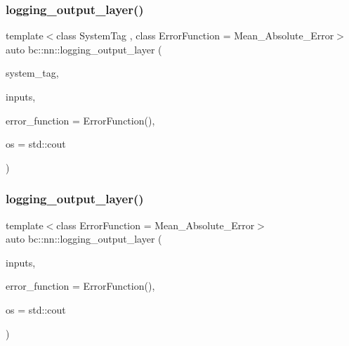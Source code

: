 \subsubsection{\texorpdfstring{logging\+\_\+output\+\_\+layer()}{logging\_output\_layer()}\hspace{0.1cm}{\footnotesize\ttfamily [2/3]}}
{\footnotesize\ttfamily template$<$class System\+Tag , class Error\+Function  = Mean\+\_\+\+Absolute\+\_\+\+Error$>$ \\
auto bc\+::nn\+::logging\+\_\+output\+\_\+layer (\begin{DoxyParamCaption}\item[{System\+Tag}]{system\+\_\+tag,  }\item[{\hyperlink{namespacebc_aaf8e3fbf99b04b1b57c4f80c6f55d3c5}{bc\+::size\+\_\+t}}]{inputs,  }\item[{Error\+Function}]{error\+\_\+function = {\ttfamily ErrorFunction()},  }\item[{std\+::ostream \&}]{os = {\ttfamily std\+:\+:cout} }\end{DoxyParamCaption})}

\mbox{\label{namespacebc_1_1nn_ab353668fc04b2496759be76e26c1697d}} 
\subsubsection{\texorpdfstring{logging\+\_\+output\+\_\+layer()}{logging\_output\_layer()}\hspace{0.1cm}{\footnotesize\ttfamily [3/3]}}
{\footnotesize\ttfamily template$<$class Error\+Function  = Mean\+\_\+\+Absolute\+\_\+\+Error$>$ \\
auto bc\+::nn\+::logging\+\_\+output\+\_\+layer (\begin{DoxyParamCaption}\item[{int}]{inputs,  }\item[{Error\+Function}]{error\+\_\+function = {\ttfamily ErrorFunction()},  }\item[{std\+::ostream \&}]{os = {\ttfamily std\+:\+:cout} }\end{DoxyParamCaption})}

\mbox{\label{namespacebc_1_1nn_a377a17e29fde2477e1098bc74ff38963}} 
